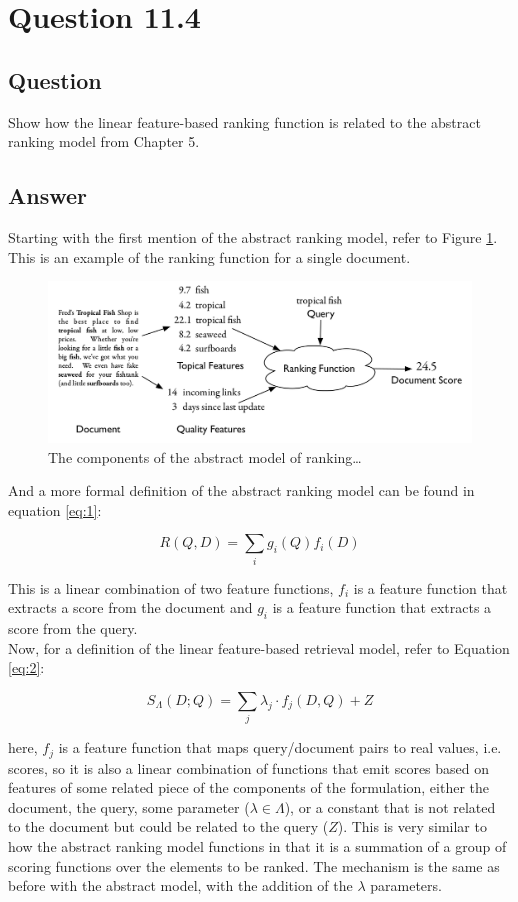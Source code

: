 \section{Question 11.4}

\subsection{Question}
Show how the linear feature-based ranking function is related to the abstract ranking model from Chapter 5.


\subsection{Answer}
Starting with the first mention of the abstract ranking model, refer to Figure \ref{fig:51}.  This is an example of the ranking function for a single document.

\begin{figure}[H]
\centering
\label{fig:51}
\includegraphics[scale=.25]{q11.4/fig51.png}
\caption{The components of the abstract model of ranking\dots}
\end{figure}

And a more formal definition of the abstract ranking model can be found in equation \ref{eq:1}:

\begin{equation}
\label{eq:1}
R(Q, D) = \sum_i g_i (Q) f_i (D)
\end{equation}

This is a linear combination of two feature functions, \(f_i\) is a feature function that extracts a score from the document and \(g_i\) is a feature function that extracts a score from the query.\\

Now, for a definition of the linear feature-based retrieval model, refer to Equation \ref{eq:2}:

\begin{equation}
\label{eq:2}
S_\Lambda(D;Q) = \sum_j \lambda_j \cdot f_j(D, Q) + Z
\end{equation}

here, \(f_j\) is a feature function that maps query/document pairs to real values, i.e. scores, so it is also a linear combination of functions that emit scores based on features of some related piece of the components of the formulation, either the document, the query, some parameter (\(\lambda \in \Lambda\)), or a constant that is not related to the document but could be related to the query (\(Z\)).  This is very similar to how the abstract ranking model functions in that it is a summation of a group of scoring functions over the elements to be ranked.  The mechanism is the same as before with the abstract model, with the addition of the \(\lambda\) parameters.
